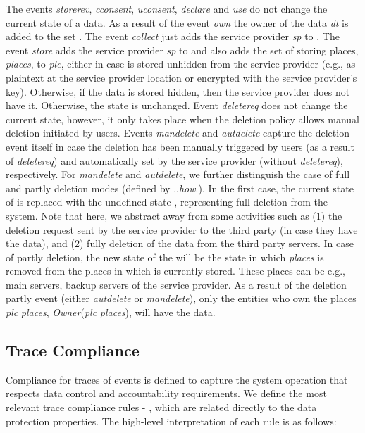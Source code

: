 \documentclass[a4paper]{article}
\begin{document}
The events \textit{storerev}, \textit{cconsent}, \textit{uconsent}, \textit{declare} and \textit{use} do not change the current state of a data. 
As a result of the event \textit{own} the owner of the data \textit{dt} is added to the set . The event \textit{collect} just adds the service provider \textit{sp} to . The event \textit{store} adds the service provider \textit{sp} to  and also adds  the set of storing places, \textit{places}, to \textit{plc}, either in case  is stored unhidden from the service provider (e.g., as plaintext at the service provider location or encrypted with the service provider's key). Otherwise, if the data is stored hidden, then the service provider does not have it. Otherwise, the state is unchanged. Event \textit{deletereq} does not change the current state, however, it only takes place when the deletion policy allows manual deletion initiated by users. Events \textit{mandelete} and  \textit{autdelete} capture the deletion event itself in case the deletion has been manually triggered by users (as a result of \textit{deletereq}) and automatically set by the service provider (without \textit{deletereq}), respectively.  For \textit{mandelete} and  \textit{autdelete}, we further distinguish the case of full and partly deletion modes (defined by ..\textit{how}.). In the first case, the current state of  is  replaced with the undefined state , representing full deletion from the system. Note that here, we abstract away from some activities such as (1) the deletion request sent by the service provider to the third party (in case they have the data), and (2)  fully deletion of the data from the third party servers. In case of partly deletion, the new state of the  will be the state in which \textit{places} is removed from the places in which   is currently stored. These places can be e.g., main servers, backup servers of the service provider. As a result of the deletion partly event (either \textit{autdelete} or \textit{mandelete}), only the entities who own the places \textit{plc}  \textit{places}, \textit{Owner}(\textit{plc}  \textit{places}), will have the data.    


\subsection{Trace Compliance}
\label{sec:compliance0}

Compliance for traces of events is defined to capture the system operation that respects data control and accountability requirements.  
We define the most relevant trace compliance rules  - , which are related directly to the data protection properties. 
The high-level interpretation of each rule is as follows: 
\end{document}
